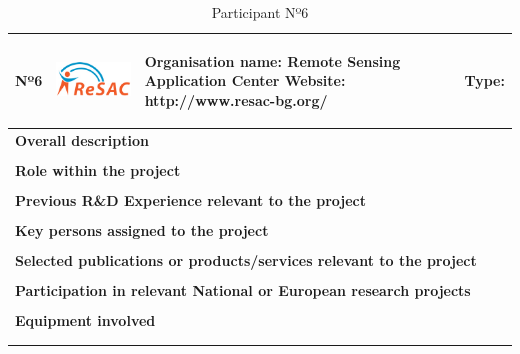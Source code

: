 \begin{longtable}[H]{|p{0.7cm}|p{4cm}|p{7cm}|p{1.3cm}|}
	\hline
	\begin{center} Nº6 \end{center} & \begin{center} \includegraphics[scale=1.2]{./logos/logo_resac} \end{center} & \begin{center} \textbf{Organisation name:} Remote Sensing Application Center \newline \textbf{Website:} http://www.resac-bg.org/ \end{center} & \begin{center} Type: \end{center} \\ \hline
	
	\multicolumn{4}{|p{13cm}|}{\textbf{Overall description}}  \\ \hline
	
	\multicolumn{4}{|p{13cm}|}{}  \\ \hline
	
	\multicolumn{4}{|p{13cm}|}{\textbf{Role within the project}}   \\ \hline
	
	\multicolumn{4}{|p{13cm}|}{}  \\ \hline
	
	\multicolumn{4}{|p{13cm}|}{\textbf{Previous R\&D Experience relevant to the project}}  \\ \hline
	
	\multicolumn{4}{|p{13cm}|}{}  \\ \hline
	
	\multicolumn{4}{|p{13cm}|}{\textbf{Key persons assigned to the project}}   \\ \hline
	
	\multicolumn{4}{|p{13cm}|}{}  \\ \hline
	
	\multicolumn{4}{|p{13cm}|}{\textbf{Selected publications or products/services relevant to the project}}  \\ \hline
	
	\multicolumn{4}{|p{13cm}|}{}  \\ \hline
	
	\multicolumn{4}{|p{13cm}|}{\textbf{Participation in relevant National or European research projects}}  \\ \hline
	
	\multicolumn{4}{|p{13cm}|}{}  \\ \hline
	
	\multicolumn{4}{|p{13cm}|}{\textbf{Equipment involved}}  \\ \hline
	
	\multicolumn{4}{|p{13cm}|}{}  \\ \hline
	\caption{Participant Nº6}
\end{longtable}

